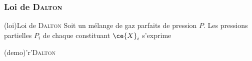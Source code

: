 \documentclass[../../main/main.tex]{subfiles}
\begin{document}
\subsubsection{Loi de \textsc{Dalton}}
\begin{tcbraster}[raster columns=2, raster equal height=rows]
	\begin{tcb*}[label=loi:dalton](loi){Loi de \textsc{Dalton}}
		Soit un mélange de gaz parfaits de pression $P$. Les pressions
		partielles $P_i$ de chaque constituant $\ce{X}_i$ s'exprime
		\psw{%
			\[\boxed{P_i = x_iP}\]
		}%
		\vspace{-15pt}
	\end{tcb*}
	\begin{tcb}[label=demo:dalton,
			list entry={\lte\thedemo~:~Loi de \textsc{Dalton}}
		](demo)'r'{\textsc{Dalton}}
		\vspace{-15pt}
	\end{tcb}
\end{tcbraster}
\end{document}

